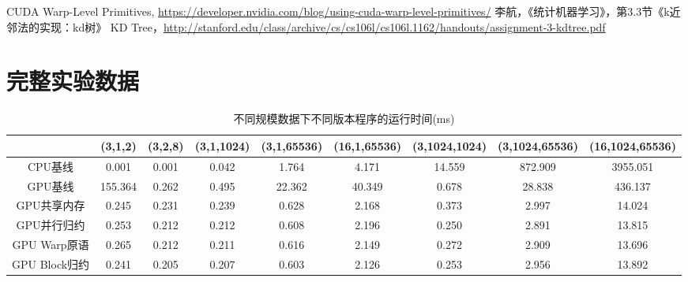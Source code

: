 \documentclass[logo,reportComp]{thesis}
\begin{document}
\begin{thebibliography}{99}
 CUDA Warp-Level Primitives, \url{https://developer.nvidia.com/blog/using-cuda-warp-level-primitives/}
 李航，《统计机器学习》，第3.3节《k近邻法的实现：kd树》
 KD Tree，\url{http://stanford.edu/class/archive/cs/cs106l/cs106l.1162/handouts/assignment-3-kdtree.pdf}
\end{thebibliography}

\appendix
\appendixconfig
\section{完整实验数据}
\label{appendix:exp}
\begin{table}[H]
\centering
\caption{不同规模数据下不同版本程序的运行时间(ms)}
\scriptsize
\begin{tabular}{ccccccccc}\hline
 & (3,1,2) & (3,2,8) & (3,1,1024) & (3,1,65536) & (16,1,65536) & (3,1024,1024) & (3,1024,65536) & (16,1024,65536)\\\hline
CPU基线 & 0.001 & 0.001 & 0.042 & 1.764 & 4.171 & 14.559 & 872.909 & 3955.051\\\hline
GPU基线 & 155.364 & 0.262 & 0.495 & 22.362 & 40.349 & 0.678 & 28.838 & 436.137\\\hline
GPU共享内存 & 0.245 & 0.231 & 0.239 & 0.628 & 2.168 & 0.373 & 2.997 & 14.024\\\hline
GPU并行归约 & 0.253 & 0.212 & 0.212 & 0.608 & 2.196 & 0.250 & 2.891 & 13.815\\\hline
GPU Warp原语 & 0.265 & 0.212 & 0.211 & 0.616 & 2.149 & 0.272 & 2.909 & 13.696\\\hline
GPU Block归约 & 0.241 & 0.205 & 0.207 & 0.603 & 2.126 & 0.253 & 2.956 & 13.892\\\hline
\end{tabular}
\end{table}
\end{document}
